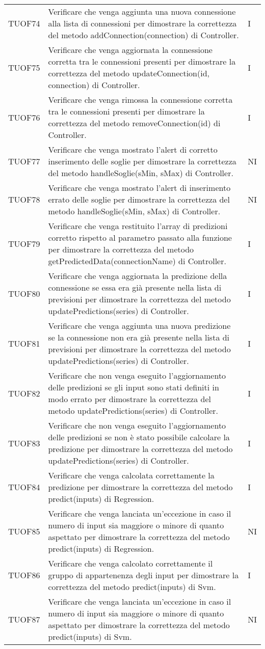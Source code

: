 \begin{longtable}{C{2cm} L{8cm} C{2cm}}
TUOF74 & Verificare che venga aggiunta una nuova connessione alla lista di connessioni per dimostrare la correttezza del metodo addConnection(connection) di Controller. & I \\
TUOF75 & Verificare che venga aggiornata la connessione corretta tra le connessioni presenti per dimostrare la correttezza del metodo updateConnection(id, connection) di Controller. & I \\
TUOF76 & Verificare che venga rimossa la connessione corretta tra le connessioni presenti per dimostrare la correttezza del metodo removeConnection(id) di Controller. & I \\
TUOF77 & Verificare che venga mostrato l'alert di corretto inserimento delle soglie per dimostrare la correttezza del metodo handleSoglie(sMin, sMax) di Controller. & NI \\
TUOF78 & Verificare che venga mostrato l'alert di inserimento errato delle soglie per dimostrare la correttezza del metodo handleSoglie(sMin, sMax) di Controller. & NI \\
TUOF79 & Verificare che venga restituito l'array di predizioni corretto rispetto al parametro passato alla funzione per dimostrare la correttezza del metodo getPredictedData(connectionName) di Controller. & I \\
TUOF80 & Verificare che venga aggiornata la predizione della connessione se essa era già presente nella lista di previsioni per dimostrare la correttezza del metodo updatePredictions(series) di Controller. & I \\
TUOF81 & Verificare che venga aggiunta una nuova predizione se la connessione non era già presente nella lista di previsioni per dimostrare la correttezza del metodo updatePredictions(series) di Controller. & I \\
TUOF82 & Verificare che non venga eseguito l'aggiornamento delle predizioni se gli input sono stati definiti in modo errato per dimostrare la correttezza del metodo updatePredictions(series) di Controller. & I \\
TUOF83 & Verificare che non venga eseguito l'aggiornamento delle predizioni se non è stato possibile calcolare la predizione per dimostrare la correttezza del metodo updatePredictions(series) di Controller. & I \\
TUOF84 & Verificare che venga calcolata correttamente la predizione per dimostrare la correttezza del metodo predict(inputs) di Regression. & I \\
TUOF85 & Verificare che venga lanciata un'eccezione in caso il numero di input sia maggiore o minore di quanto aspettato per dimostrare la correttezza del metodo predict(inputs) di Regression. & NI \\
TUOF86 & Verificare che venga calcolato correttamente il gruppo di appartenenza degli input per dimostrare la correttezza del metodo predict(inputs) di Svm. & I \\
TUOF87 & Verificare che venga lanciata un'eccezione in caso il numero di input sia maggiore o minore di quanto aspettato per dimostrare la correttezza del metodo predict(inputs) di Svm. & NI \\

\end{longtable}

